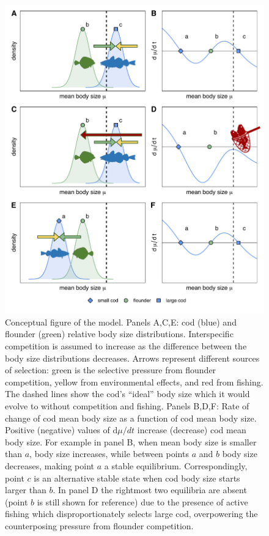\documentclass[9pt,twocolumn,twoside]{pnas-new}
\begin{document}
\begin{figure}%
\centering
\includegraphics[width=1\linewidth]{fig1.pdf}
\caption{Conceptual figure of the model. Panels A,C,E: cod (blue) and flounder (green) relative body size distributions. Interspecific competition is assumed to increase as the difference between the body size distributions decreases. Arrows represent different sources of selection: green is the selective pressure from flounder competition, yellow from environmental effects, and red from fishing. The dashed lines show the cod's ``ideal'' body size which it would evolve to without competition and fishing. Panels B,D,F: Rate of change of cod mean body size as a function of cod mean body size. Positive (negative) values of $\text{d}\mu/dt$ increase (decrease) cod mean body size. For example in panel B, when mean body size is smaller than $a$, body size increases, while between points $a$ and $b$ body size decreases, making point $a$ a stable equilibrium. Correspondingly, point $c$ is an alternative stable state when cod body size starts larger than $b$. In panel D the rightmost two equilibria are absent (point $b$ is still shown for reference) due to the presence of active fishing which disproportionately selects large cod, overpowering the counterposing pressure from flounder competition.}
\label{fig:sizegrid}
\end{figure}
\end{document}
